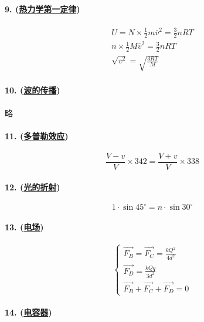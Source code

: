 \paragraph{9. (\hyperref[subsec:热力学第一定律]{热力学第一定律})}

\begin{gather*}
    U=N\times\frac12m\bar{v}^2=\frac32nRT\\
    n\times\frac12M\bar{v}^2=\frac32nRT\\
    \sqrt{\bar{v}^2}=\sqrt{\frac{3RT}{M}}
\end{gather*}

\paragraph{10. (\hyperref[subsec:波的传播]{波的传播})} 略
\paragraph{11. (\hyperref[subsec:多普勒效应]{多普勒效应})}

\begin{equation*}
    \frac{V-v}{V}\times342=\frac{V+v}{V}\times338
\end{equation*}

\paragraph{12. (\hyperref[subsec:光的折射]{光的折射})}

\begin{equation*}
    1\cdot\sin45^\circ=n\cdot\sin30^\circ
\end{equation*}

\paragraph{13. (\hyperref[subsec:电场]{电场})}

\begin{equation*}
    \begin{cases}
        \vec{F_B}=\vec{F_C}=\frac{kQ^2}{4d^2}\\
        \vec{F_D}=\frac{kQq}{3d^2}\\
        \vec{F_B}+\vec{F_C}+\vec{F_D}=0
    \end{cases}
\end{equation*}

\paragraph{14. (\hyperref[subsec:电容器]{电容器})}

